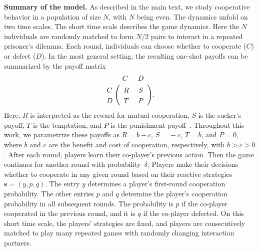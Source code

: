 \documentclass[11pt]{article}
\theoremstyle{plainCl1}
\theoremstyle{plainCl2}
\begin{document}
\noindent
{\bf Summary of the model.} As described in the main text, we study cooperative behavior in a population of size $N$, with $N$ being even.
The dynamics unfold on two time scales. 
The short time scale describes the game dynamics. 
Here the $N$ individuals are randomly matched to form $N/2$ pairs to interact in a repeated prisoner's dilemma.  
Each round, individuals can choose whether to cooperate ($C$) or defect ($D$). 
In the most general setting, the resulting one-shot payoffs can be summarized by the payoff matrix 
\begin{align}
	\bordermatrix{%
		& C & D \cr
		C &\ R &\ S\  \cr
		D &\ T &\ P\ \cr
	} . \label{eq:prisoner}
\end{align}
Here, $R$ is interpreted as the reward for mutual cooperation, $S$ is the sucker's payoff, $T$ is the temptation, and $P$ is the punishment payoff~\citep{axelrod1981evolution}. 
Throughout this work, we parametrize these payoffs as $R\!=\!b\!-\!c$, $S\!=\!-c$, $T\!=\!b$, and $P\!=\!0$, where $b$ and $c$ are the benefit and cost of cooperation, respectively, with $b\!>\!c\!>0$. 
After each round, players learn their co-player's previous action. 
Then the game continues for another round with probability~$\delta$.
Players make their decisions whether to cooperate in any given round based on their reactive strategies $\mathbf{s}\!=\!(y,p,q)$. 
The entry $y$ determines a player's first-round cooperation probability. 
The other entries $p$ and $q$ determine the player's cooperation probability in all subsequent rounds. 
The probability is $p$ if the co-player cooperated in the previous round, and it is $q$ if the co-player defected. 
On this short time scale, the players' strategies are fixed, and players are consecutively matched to play many repeated games with randomly changing interaction partners. 

\end{document}
